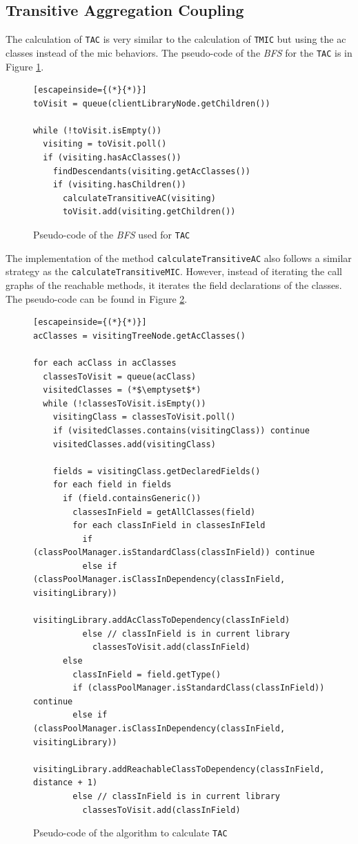\subsection{Transitive Aggregation Coupling}
The calculation of \texttt{TAC} is very similar to the calculation of \texttt{TMIC} but using the ac classes instead of the mic behaviors. The pseudo-code of the \textit{BFS} for the \texttt{TAC} is in Figure \ref{fig:tree-traversing-tac}.

\begin{figure}[ht!]
\begin{lstlisting}[escapeinside={(*}{*)}]
toVisit = queue(clientLibraryNode.getChildren())

while (!toVisit.isEmpty())
  visiting = toVisit.poll()
  if (visiting.hasAcClasses())
    findDescendants(visiting.getAcClasses())
    if (visiting.hasChildren())
      calculateTransitiveAC(visiting)
      toVisit.add(visiting.getChildren())
\end{lstlisting}
\caption{Pseudo-code of the \textit{BFS} used for \texttt{TAC}}
\label{fig:tree-traversing-tac}
\end{figure}

The implementation of the method \texttt{calculateTransitiveAC} also follows a similar strategy as the \texttt{calculateTransitiveMIC}. However, instead of iterating the call graphs of the reachable methods, it iterates the field declarations of the classes. The pseudo-code can be found in Figure \ref{fig:calculate-tac}.

\begin{figure}[ht!]
\begin{lstlisting}[escapeinside={(*}{*)}]
acClasses = visitingTreeNode.getAcClasses()

for each acClass in acClasses
  classesToVisit = queue(acClass)
  visitedClasses = (*$\emptyset$*)
  while (!classesToVisit.isEmpty())
    visitingClass = classesToVisit.poll()
    if (visitedClasses.contains(visitingClass)) continue
    visitedClasses.add(visitingClass)

    fields = visitingClass.getDeclaredFields()
    for each field in fields
      if (field.containsGeneric())
        classesInField = getAllClasses(field)
        for each classInField in classesInFIeld
          if (classPoolManager.isStandardClass(classInField)) continue
          else if (classPoolManager.isClassInDependency(classInField, visitingLibrary))
            visitingLibrary.addAcClassToDependency(classInField)
          else // classInField is in current library
            classesToVisit.add(classInField)
      else
        classInField = field.getType()
        if (classPoolManager.isStandardClass(classInField)) continue
        else if (classPoolManager.isClassInDependency(classInField, visitingLibrary))
          visitingLibrary.addReachableClassToDependency(classInField, distance + 1)
        else // classInField is in current library
          classesToVisit.add(classInField)
\end{lstlisting}
\caption{Pseudo-code of the algorithm to calculate \texttt{TAC}}
\label{fig:calculate-tac}
\end{figure}


